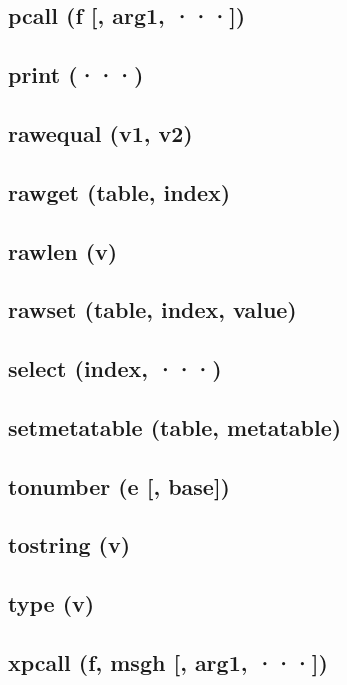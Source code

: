 \documentclass[12pt]{article}
\begin{document}
\subsection{pcall (f [, arg1, ···])}

\subsection{print (···)}

\subsection{rawequal (v1, v2)}

\subsection{rawget (table, index)}

\subsection{rawlen (v)}

\subsection{rawset (table, index, value)}

\subsection{select (index, ···)}

\subsection{setmetatable (table, metatable)}

\subsection{tonumber (e [, base])}

\subsection{tostring (v)}

\subsection{type (v)}

\subsection{xpcall (f, msgh [, arg1, ···])}
\end{document}
